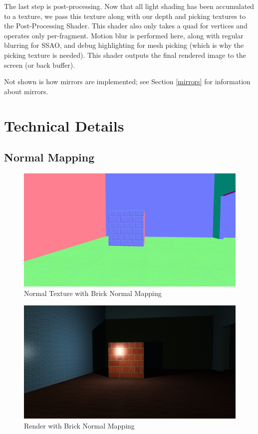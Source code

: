 \documentclass{book}
\begin{document}
      The last step is post-processing. Now that all light shading has been accumulated to a texture, we pass this texture along with our depth and picking textures to the Post-Processing Shader. This shader also only takes a quad for vertices and operates only per-fragment. Motion blur is performed here, along with regular blurring for SSAO, and debug highlighting for mesh picking (which is why the picking texture is needed). This shader outputs the final rendered image to the screen (or back buffer).

      Not shown is how mirrors are implemented; see Section \ref{mirrors} for information about mirrors.


  \section{Technical Details} \label{technical-objectives}
    \subsection{Normal Mapping} \label{normal-mapping}
      \begin{figure}[h!]
        \centering
        \includegraphics[width=1.0\textwidth]{normal_mapping_normal}
        \caption{Normal Texture with Brick Normal Mapping}
      \end{figure}

      \begin{figure}[h!]
        \centering
        \includegraphics[width=1.0\textwidth]{normal_mapping_accum}
        \caption{Render with Brick Normal Mapping}
        \label{brick-normal-map}
      \end{figure}
\end{document}
